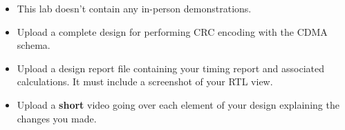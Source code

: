 \begin{itemize}
    \item This lab doesn't contain any in-person demonstrations.
    \item Upload a complete design for performing CRC encoding with the CDMA schema.
    \item Upload a design report file containing your timing report and associated calculations. It must include a screenshot of your RTL view.
    \item Upload a \textbf{short} video going over each element of your design explaining the changes you made.
\end{itemize}